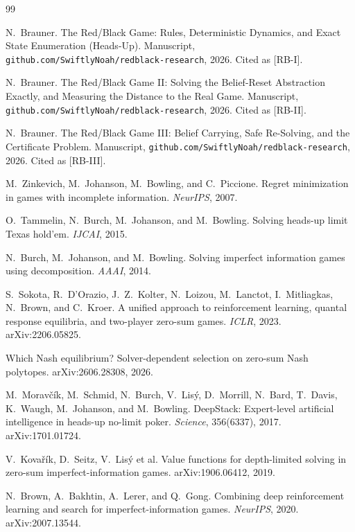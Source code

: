 \documentclass[11pt]{article}
\theoremstyle{plain}
\theoremstyle{definition}
\theoremstyle{remark}
\newcommand{\code}[1]{\texttt{\small #1}}
\begin{document}
\begin{thebibliography}{99}\small

 N.~Brauner. The Red/Black Game: Rules, Deterministic
  Dynamics, and Exact State Enumeration (Heads-Up). Manuscript,
  \code{github.com/SwiftlyNoah/redblack-research}, 2026. Cited as
  [RB-I].

 N.~Brauner. The Red/Black Game II: Solving the
  Belief-Reset Abstraction Exactly, and Measuring the Distance to the
  Real Game. Manuscript,
  \code{github.com/SwiftlyNoah/redblack-research}, 2026. Cited as
  [RB-II].

 N.~Brauner. The Red/Black Game III: Belief Carrying,
  Safe Re-Solving, and the Certificate Problem. Manuscript,
  \code{github.com/SwiftlyNoah/redblack-research}, 2026. Cited as
  [RB-III].

 M.~Zinkevich, M.~Johanson, M.~Bowling, and
  C.~Piccione. Regret minimization in games with incomplete
  information. \emph{NeurIPS}, 2007.

 O.~Tammelin, N.~Burch, M.~Johanson, and
  M.~Bowling. Solving heads-up limit Texas hold'em. \emph{IJCAI},
  2015.

 N.~Burch, M.~Johanson, and M.~Bowling. Solving
  imperfect information games using decomposition. \emph{AAAI}, 2014.

 S.~Sokota, R.~D'Orazio, J.~Z.~Kolter,
  N.~Loizou, M.~Lanctot, I.~Mitliagkas, N.~Brown, and C.~Kroer. A
  unified approach to reinforcement learning, quantal response
  equilibria, and two-player zero-sum games. \emph{ICLR}, 2023.
  arXiv:2206.05825.

 Which Nash equilibrium? Solver-dependent
  selection on zero-sum Nash polytopes. arXiv:2606.28308, 2026.

 M.~Morav\v{c}\'ik, M.~Schmid, N.~Burch,
  V.~Lis\'y, D.~Morrill, N.~Bard, T.~Davis, K.~Waugh, M.~Johanson,
  and M.~Bowling. DeepStack: Expert-level artificial intelligence in
  heads-up no-limit poker. \emph{Science}, 356(6337), 2017.
  arXiv:1701.01724.

 V.~Kova\v{r}\'ik, D.~Seitz, V.~Lis\'y et al.
  Value functions for depth-limited solving in zero-sum
  imperfect-information games. arXiv:1906.06412, 2019.

 N.~Brown, A.~Bakhtin, A.~Lerer, and Q.~Gong.
  Combining deep reinforcement learning and search for
  imperfect-information games. \emph{NeurIPS}, 2020. arXiv:2007.13544.


\end{thebibliography}
\end{document}
